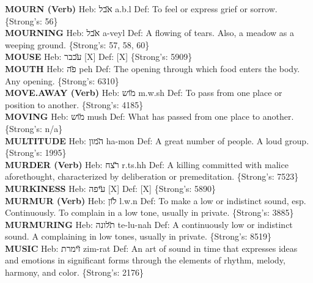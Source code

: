 {\textbf{MOURN (Verb)} Heb: {\large\H אבל} a.b.l Def: To feel or express grief or sorrow. \{Strong's: 56\}\hfill{}\\

\textbf{MOURNING} Heb: {\large\H אבל} a-veyl Def: A flowing of tears. Also, a meadow as a weeping ground. \{Strong's: 57, 58, 60\}\hfill{}\\

\textbf{MOUSE} Heb: {\large\H עכבר} {[}X{]} Def: {[}X{]} \{Strong's: 5909\}\hfill{}\\

\textbf{MOUTH} Heb: {\large\H פה} peh Def: The opening through which food enters the body. Any opening. \{Strong's: 6310\}\hfill{}\\

\textbf{MOVE.AWAY (Verb)} Heb: {\large\H מוש} m.w.sh Def: To pass from one place or position to another. \{Strong's: 4185\}\hfill{}\\

\textbf{MOVING} Heb: {\large\H מוש} mush Def: What has passed from one place to another. \{Strong's: n/a\}\hfill{}\\

\textbf{MULTITUDE} Heb: {\large\H המון} ha-mon Def: A great number of people. A loud group. \{Strong's: 1995\}\hfill{}\\

\textbf{MURDER (Verb)} Heb: {\large\H רצח} r.ts.hh Def: A killing committed with malice aforethought, characterized by deliberation or premeditation. \{Strong's: 7523\}\hfill{}\\

\textbf{MURKINESS} Heb: {\large\H עיפה} {[}X{]} Def: {[}X{]} \{Strong's: 5890\}\hfill{}\\

\textbf{MURMUR (Verb)} Heb: {\large\H לון} l.w.n Def: To make a low or indistinct sound, esp. Continuously. To complain in a low tone, usually in private. \{Strong's: 3885\}\hfill{}\\

\textbf{MURMURING} Heb: {\large\H תלונה} te-lu-nah Def: A continuously low or indistinct sound. A complaining in low tones, usually in private. \{Strong's: 8519\}\hfill{}\\

\textbf{MUSIC} Heb: {\large\H זימרת} zim-rat Def: An art of sound in time that expresses ideas and emotions in significant forms through the elements of rhythm, melody, harmony, and color. \{Strong's: 2176\}\hfill{}\\

}
